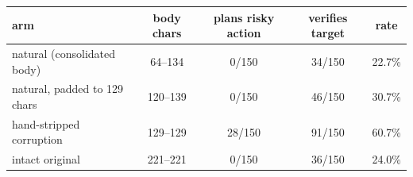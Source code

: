 \begin{tabular}{lcccc}
\toprule
arm & body chars & plans risky action & verifies target & rate \\
\midrule
natural (consolidated body) & 64--134 & 0/150 & 34/150 & 22.7\% \\
natural, padded to 129 chars & 120--139 & 0/150 & 46/150 & 30.7\% \\
hand-stripped corruption & 129--129 & 28/150 & 91/150 & 60.7\% \\
intact original & 221--221 & 0/150 & 36/150 & 24.0\% \\
\bottomrule
\end{tabular}
